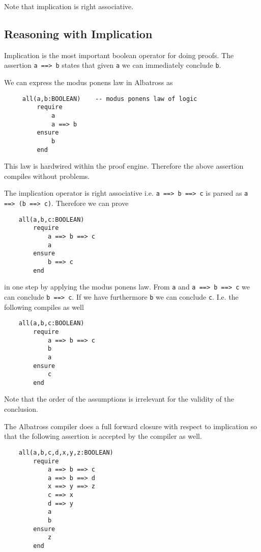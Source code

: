 Note that implication is right associative.

\subsection{Reasoning with Implication}

Implication is the most important boolean operator for doing proofs. The
assertion \lstinline!a ==> b! states that given \lstinline!a! we can
immediately conclude \lstinline!b!.

We can express the modus ponens law in Albatross as

\begin{lstlisting}
     all(a,b:BOOLEAN)    -- modus ponens law of logic
         require
             a
             a ==> b
         ensure
             b
         end
\end{lstlisting}

This law is hardwired within the proof engine. Therefore the above assertion
compiles without problems.


The implication operator is right associative i.e. \lstinline!a ==> b ==> c!
is parsed as \lstinline!a ==> (b ==> c)!. Therefore we can prove

\begin{lstlisting}
    all(a,b,c:BOOLEAN)
        require
            a ==> b ==> c
            a
        ensure
            b ==> c
        end
\end{lstlisting}

in one step by applying the modus ponens law. From \lstinline!a! and
\lstinline!a ==> b ==> c! we can conclude \lstinline!b ==> c!. If we have
furthermore \lstinline!b! we can conclude \lstinline!c!. I.e. the following
compiles as well


\begin{lstlisting}
    all(a,b,c:BOOLEAN)
        require
            a ==> b ==> c
            b
            a
        ensure
            c
        end
\end{lstlisting}

Note that the order of the assumptions is irrelevant for the validity of the
conclusion.

The Albatross compiler does a full forward closure with respect to implication
so that the following assertion is accepted by the compiler as well.

\begin{lstlisting}
    all(a,b,c,d,x,y,z:BOOLEAN)
        require
            a ==> b ==> c
            a ==> b ==> d
            x ==> y ==> z
            c ==> x
            d ==> y
            a
            b
        ensure
            z
        end
\end{lstlisting}


